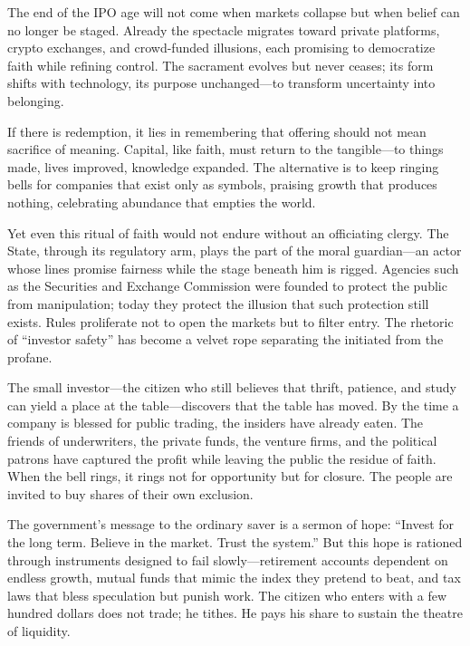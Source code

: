 \documentclass[11pt,twoside]{book}
\begin{document}
The end of the IPO age will not come when markets collapse but when belief can no longer be staged.  Already the spectacle migrates toward private platforms, crypto exchanges, and crowd-funded illusions, each promising to democratize faith while refining control.  The sacrament evolves but never ceases; its form shifts with technology, its purpose unchanged—to transform uncertainty into belonging.

If there is redemption, it lies in remembering that offering should not mean sacrifice of meaning.  Capital, like faith, must return to the tangible—to things made, lives improved, knowledge expanded.  The alternative is to keep ringing bells for companies that exist only as symbols, praising growth that produces nothing, celebrating abundance that empties the world.

Yet even this ritual of faith would not endure without an officiating clergy.  
The State, through its regulatory arm, plays the part of the moral guardian—an actor whose lines promise fairness while the stage beneath him is rigged.  
Agencies such as the Securities and Exchange Commission were founded to protect the public from manipulation; today they protect the illusion that such protection still exists.  
Rules proliferate not to open the markets but to filter entry.  
The rhetoric of “investor safety” has become a velvet rope separating the initiated from the profane.

The small investor—the citizen who still believes that thrift, patience, and study can yield a place at the table—discovers that the table has moved.  
By the time a company is blessed for public trading, the insiders have already eaten.  
The friends of underwriters, the private funds, the venture firms, and the political patrons have captured the profit while leaving the public the residue of faith.  
When the bell rings, it rings not for opportunity but for closure.  
The people are invited to buy shares of their own exclusion.

The government’s message to the ordinary saver is a sermon of hope:  
“Invest for the long term. Believe in the market. Trust the system.”  
But this hope is rationed through instruments designed to fail slowly—retirement accounts dependent on endless growth, mutual funds that mimic the index they pretend to beat, and tax laws that bless speculation but punish work.  
The citizen who enters with a few hundred dollars does not trade; he tithes.  
He pays his share to sustain the theatre of liquidity.  
\end{document}
